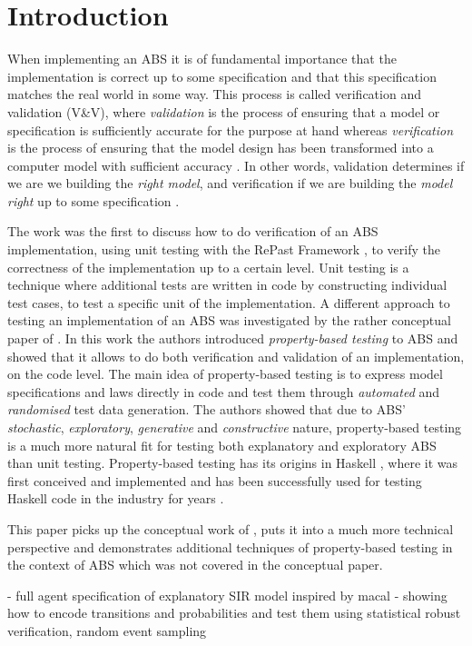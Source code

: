 \section{Introduction}
When implementing an ABS it is of fundamental importance that the implementation is correct up to some specification and that this specification matches the real world in some way. This process is called verification and validation (V\&V), where \textit{validation} is the process of ensuring that a model or specification is sufficiently accurate for the purpose at hand whereas \textit{verification} is the process of ensuring that the model design has been transformed into a computer model with sufficient accuracy \cite{robinson_simulation:_2014}. In other words, validation determines if we are we building the \textit{right model}, and verification if we are building the \textit{model right} up to some specification \cite{balci_verification_1998}.

The work \cite{collier_test-driven_2013} was the first to discuss how to do verification of an ABS implementation, using unit testing with the RePast Framework \cite{north_complex_2013}, to verify the correctness of the implementation up to a certain level. Unit testing is a technique where additional tests are written in code by constructing individual test cases, to test a specific unit of the implementation. A different approach to testing an implementation of an ABS was investigated by the rather conceptual paper of \cite{thaler_show_2019}. In this work the authors introduced \textit{property-based testing} to ABS and showed that it allows to do both verification and validation of an implementation, on the code level. The main idea of property-based testing is to express model specifications and laws directly in code and test them through \textit{automated} and \textit{randomised} test data generation. The authors showed that due to ABS' \textit{stochastic}, \textit{exploratory}, \textit{generative} and \textit{constructive} nature, property-based testing is a much more natural fit for testing both explanatory and exploratory ABS than unit testing. Property-based testing has its origins in Haskell \cite{claessen_quickcheck_2000,claessen_testing_2002}, where it was first conceived and implemented and has been successfully used for testing Haskell code in the industry for years \cite{hughes_quickcheck_2007}.

This paper picks up the conceptual work of \cite{thaler_show_2019}, puts it into a much more technical perspective and demonstrates additional techniques of property-based testing in the context of ABS which was not covered in the conceptual paper.

- full agent specification of explanatory SIR model inspired by macal
- showing how to encode transitions and probabilities and test them using statistical robust verification, random event sampling